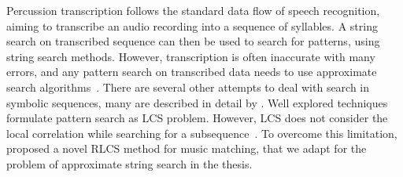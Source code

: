 Percussion transcription follows the standard data flow of speech recognition, aiming to transcribe an audio recording into a sequence of syllables. A string search on transcribed sequence can then be used to search for patterns, using string search methods. However, transcription is often inaccurate with many errors, and any pattern search on transcribed data needs to use approximate search algorithms~\cite{navarro:01:strDist}. There are several other attempts to deal with search in symbolic sequences, many are described in detail by . Well explored techniques formulate pattern search as \gls{LCS} problem. However, \gls{LCS} does not consider the local correlation while searching for a subsequence~\cite{lin:11:rlcs}. To overcome this limitation,  proposed a novel \gls{RLCS} method for music matching, that we adapt for the problem of approximate string search in the thesis. 
%
%
